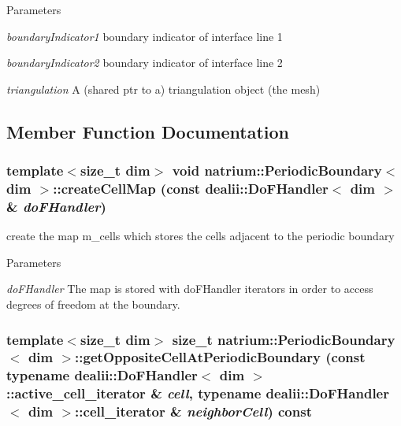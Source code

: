 \begin{DoxyParams}{Parameters}
\item[{\em boundaryIndicator1}]boundary indicator of interface line 1 \item[{\em boundaryIndicator2}]boundary indicator of interface line 2 \item[{\em triangulation}]A (shared ptr to a) triangulation object (the mesh) \end{DoxyParams}


\subsection{Member Function Documentation}
\hypertarget{classnatrium_1_1PeriodicBoundary_a233d460baa307b13bc32efb57c07f7c5}{
\subsubsection[{createCellMap}]{\setlength{\rightskip}{0pt plus 5cm}template$<$size\_\-t dim$>$ void {\bf natrium::PeriodicBoundary}$<$ dim $>$::createCellMap (const dealii::DoFHandler$<$ dim $>$ \& {\em doFHandler})}}
\label{classnatrium_1_1PeriodicBoundary_a233d460baa307b13bc32efb57c07f7c5}


create the map m\_\-cells which stores the cells adjacent to the periodic boundary 
\begin{DoxyParams}{Parameters}
\item[{\em doFHandler}]The map is stored with doFHandler iterators in order to access degrees of freedom at the boundary. \end{DoxyParams}
\hypertarget{classnatrium_1_1PeriodicBoundary_aaa861135e070feb4b3dd4408c487cd14}{
\subsubsection[{getOppositeCellAtPeriodicBoundary}]{\setlength{\rightskip}{0pt plus 5cm}template$<$size\_\-t dim$>$ size\_\-t {\bf natrium::PeriodicBoundary}$<$ dim $>$::getOppositeCellAtPeriodicBoundary (const typename dealii::DoFHandler$<$ dim $>$::active\_\-cell\_\-iterator \& {\em cell}, \/  typename dealii::DoFHandler$<$ dim $>$::cell\_\-iterator \& {\em neighborCell}) const}}
\label{classnatrium_1_1PeriodicBoundary_aaa861135e070feb4b3dd4408c487cd14}


